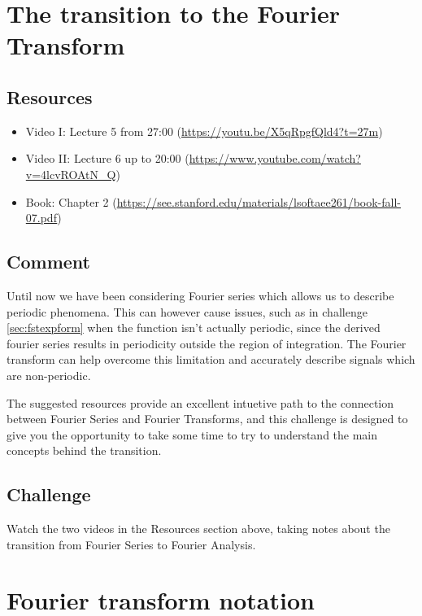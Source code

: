 \newpage
\section{The transition to the Fourier Transform}

\subsection*{Resources}
\begin{itemize}
    \item Video I: Lecture 5 from 27:00 (\url{https://youtu.be/X5qRpgfQld4?t=27m})
    \item Video II: Lecture 6 up to 20:00 (\url{https://www.youtube.com/watch?v=4lcvROAtN_Q})
    \item Book: Chapter 2 (\url{https://see.stanford.edu/materials/lsoftaee261/book-fall-07.pdf})
\end{itemize}

\subsection*{Comment}
Until now we have been considering Fourier series which allows us to describe periodic phenomena. This can however cause issues, such as in challenge \ref{sec:fstexpform} when the function isn't actually periodic, since the derived fourier series results in periodicity outside the region of integration. The Fourier transform can help overcome this limitation and accurately describe signals which are non-periodic.

The suggested resources provide an excellent intuetive path to the connection between Fourier Series and Fourier Transforms, and this challenge is designed to give you the opportunity to take some time to try to understand the main concepts behind the transition.

\subsection*{Challenge}
Watch the two videos in the Resources section above, taking notes about the transition from Fourier Series to Fourier Analysis.




\newpage
\section{Fourier transform notation}

